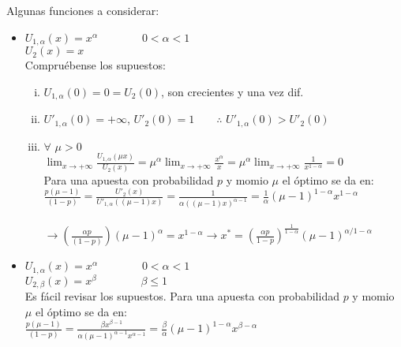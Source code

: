 Algunas funciones a considerar:
\begin{itemize}
 \item $U_{1,\alpha}(x)=x^{\alpha}\qquad\qquad 0<\alpha<1$\\ 
 $U_2(x)=x$\\
 
 Compruébense los supuestos:
 \begin{enumerate}[(i)]
  \item $U_{1,\alpha}(0)=0=U_2(0)$, son crecientes y una vez dif.
  \item $U'_{1,\alpha}(0)=+\infty$, $U'_2(0)=1\qquad{\therefore \,\, U'_{1,\alpha}(0)>U'_2(0)}$
  \item $\forall \,\, \mu>0$\\
  
  $\displaystyle\lim_{x\rightarrow +\infty}\displaystyle\frac{U_{1,\alpha}(\mu x)}{U_2(x)}=\mu^{\alpha}\displaystyle\lim_{x\rightarrow +\infty}\displaystyle\frac{x^{\alpha}}{x}=\mu^{\alpha}\displaystyle\lim_{x\rightarrow +\infty}\displaystyle\frac{1}{x^{1-\alpha}}=0$\\
  
  Para una apuesta con probabilidad $p$ y momio $\mu$ el óptimo se da en:\\
  
  $\displaystyle{\frac{p(\mu-1)}{(1-p)}=\frac{U'_2(x)}{U'_{1,\alpha}((\mu-1)x)}=\frac{1}{\alpha((\mu-1)x)^{\alpha-1}}=\frac{1}{\alpha}(\mu-1)^{1-\alpha}x^{1-\alpha}}$\\\\
  
  $\rightarrow \left(\displaystyle\frac{\alpha p}{(1-p)}\right)(\mu-1)^{\alpha}=x^{1-\alpha}\rightarrow x^*=\left(\displaystyle\frac{\alpha p}{1-p}\right)^{\frac{1}{1-\alpha}}(\mu-1)^{\alpha/1-\alpha}$\\
 \end{enumerate}

 \item $U_{1,\alpha}(x)=x^{\alpha}\qquad\qquad 0<\alpha<1$\\
 $U_{2,\beta}(x)=x^{\beta}\qquad\qquad \beta \le1$\\
 
 Es fácil revisar los supuestos. Para una apuesta con probabilidad $p$ y momio $\mu$ el óptimo se da en:\\
 
 ${\displaystyle\frac{p(\mu-1)}{(1-p)}=\frac{\beta x^{\beta-1}}{\alpha(\mu-1)^{\alpha-1}x^{\alpha-1}}=\frac{\beta}{\alpha}(\mu-1)^{1-\alpha}x^{\beta-\alpha}}$\\
 

\end{itemize}
